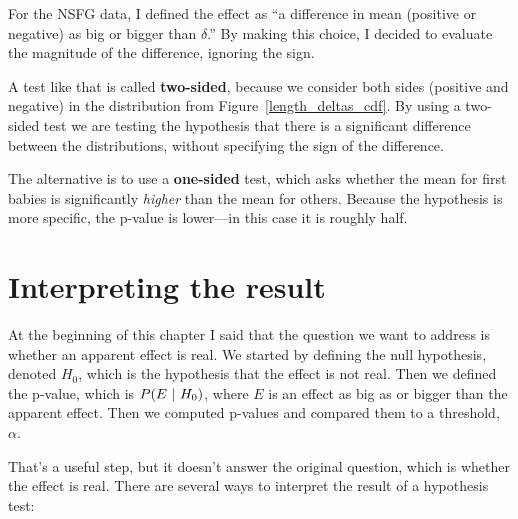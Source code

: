 \documentclass[12pt]{book}
\begin{document}
For the NSFG data, I defined the effect as ``a difference in mean
(positive or negative) as big or bigger than $\delta$.''  By making
this choice, I decided to evaluate the magnitude of the difference,
ignoring the sign.


A test like that is called {\bf two-sided}, because we consider both
sides (positive and negative) in the distribution from
Figure~\ref{length_deltas_cdf}.  By using a two-sided test we are
testing the hypothesis that there is a significant difference between
the distributions, without specifying the sign of the difference.


The alternative is to use a {\bf one-sided} test, which asks whether
the mean for first babies is significantly {\em higher} than
the mean for others.  Because the hypothesis is more specific, the
p-value is lower---in this case it is roughly half.


\section{Interpreting the result}

At the beginning of this chapter I said that the question we want to
address is whether an apparent effect is real.  We started by defining
the null hypothesis, denoted $H_0$, which is the
hypothesis that the effect is not real.  Then we defined the p-value,
which is $P(E ~|~ H_0)$, where $E$ is an effect as big as or bigger than
the apparent effect.  Then we computed p-values and compared
them to a threshold, $\alpha$.

That's a useful step, but it doesn't answer the original question,
which is whether the effect is real.  There are several ways to
interpret the result of a hypothesis test:
\end{document}
